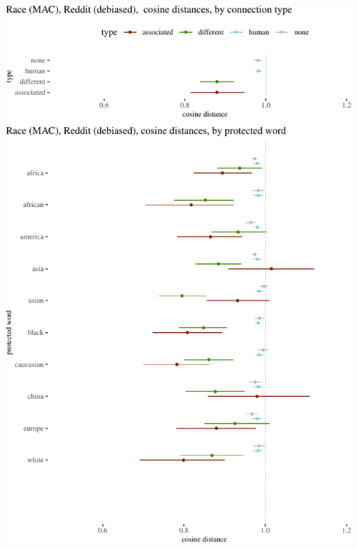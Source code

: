 \documentclass{clv3}
\begin{document}
\begin{center}\includegraphics[width=1\linewidth]{figures/resultsDebiasedRaceReddita} \end{center}
\end{document}
